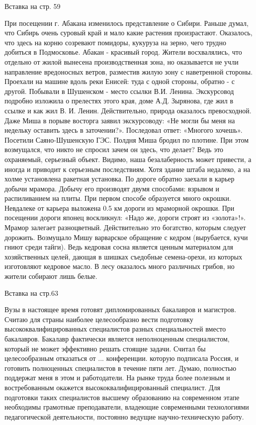 Вставка на стр. 59

При посещении г. Абакана изменилось представление о Сибири. Раньше думал, что Сибирь очень суровый край и мало какие растения произрастают. Оказалось, что здесь на корню созревают помидоры, кукуруза на зерно, чего трудно добиться в Подмосковье. Абакан - красивый город.  Жители восхвалялись, что отдельно от жилой вынесена производственная зона, но оказывается не учли направление вредоносных ветров, разместив жилую зону с наветренной стороны. Проехали на машине вдоль реки Енисей: туда с одной стороны, обратно - с другой. Побывали в Шушенском - место ссылки В.И. Ленина. Экскурсовод подробно изложила о прелестях этого края, доме А.Д. Зырянова, где жил в ссылке и как жил В. И. Ленин. Действительно, природа оказалось превосходной. Даже Миша в порыве восторга заявил экскурсоводу: «Не могли бы меня на недельку оставить здесь в заточении?». Последовал ответ: «Многого хочешь». Посетили Саяно-Шушенскую ГЭС. Полдня Миша бродил по плотине. При этом возмущался, что никто не спросил зачем он здесь, что делает? Ведь это охраняемый, серьезный объект. Видимо, наша безалаберность может привести, а иногда и приводит к серьезным последствиям. Хотя здание штаба недалеко, а на холме установлена ракетная установка. По дороге обратно заехали в карьер добычи мрамора. Добычу его производят двумя способами: взрывом и распиливанием на плиты. При первом способе образуется много окрошки. Невдалеке от карьера выложена 0.5 км дороги из мраморной окрошки. При посещении дороги японец воскликнул: «Надо же, дороги строят из «золота»!». Мрамор залегает разноцветный. Действительно это богатство, которым следует дорожить. Возмущало Мишу варварское обращение с кедром (вырубается, кучи гниют среди тайги). Ведь кедровая сосна является ценным материалом для хозяйственных целей, дающая в шишках съедобные семена-орехи, из которых изготовляют кедровое масло. В лесу оказалось много различных грибов, но жители собирают лишь белые.

Вставка на стр.63

Вузы в настоящее время готовят дипломированных бакалавров и магистров. Считаю для страны наиболее целесообразно вести подготовку высококвалифицированных специалистов разных специальностей вместо бакалавров. Бакалавр фактически является неполноценным специалистом, который не может эффективно решать стоящие задачи. Считал бы целесообразным отказаться от ... конференции. которую подписала Россия, и готовить полноценных специалистов в течение пяти лет. Думаю, полностью поддержат меня в этом и работодатели. На рынке труда более полезным и востребованным окажется высококвалифицированный специалист. Для подготовки таких специалистов высшему образованию на современном этапе необходимы грамотные преподаватели, владеющие современными технологиями педагогической деятельности, постоянно ведущие научно-техническую работу.


